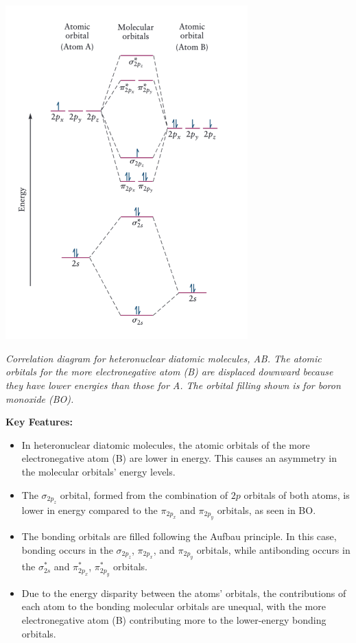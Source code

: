 \documentclass{report}
\begin{document}
\begin{center}
	\includegraphics[width=0.7\textwidth]{7.png}
\end{center}
\textit{Correlation diagram for heteronuclear diatomic molecules, AB. The atomic orbitals for the more electronegative atom (B) are displaced downward because they have lower energies than those for A. The orbital filling shown is for boron monoxide (BO).}

\textbf{Key Features:}
\begin{itemize}
	\item In heteronuclear diatomic molecules, the atomic orbitals of the more electronegative atom (B) are lower in energy. This causes an asymmetry in the molecular orbitals' energy levels.

	\item The $\sigma_{2p_z}$ orbital, formed from the combination of $2p$ orbitals of both atoms, is lower in energy compared to the $\pi_{2p_x}$ and $\pi_{2p_y}$ orbitals, as seen in BO.

	\item The bonding orbitals are filled following the Aufbau principle. In this case, bonding occurs in the $\sigma_{2p_z}$, $\pi_{2p_x}$, and $\pi_{2p_y}$ orbitals, while antibonding occurs in the $\sigma^*_{2s}$ and $\pi^*_{2p_x}$, $\pi^*_{2p_y}$ orbitals.

	\item Due to the energy disparity between the atoms' orbitals, the contributions of each atom to the bonding molecular orbitals are unequal, with the more electronegative atom (B) contributing more to the lower-energy bonding orbitals.
\end{itemize}
\end{document}
